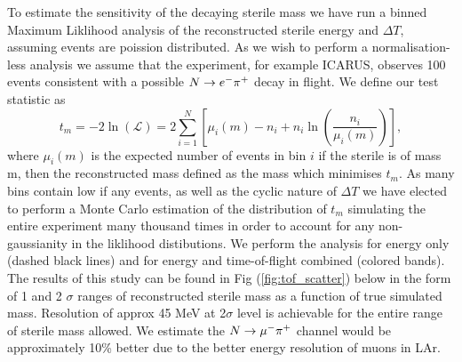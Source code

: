 \documentclass[11pt, a4paper]{article}
\def\ster{\ensuremath N}
\begin{document}
To estimate the sensitivity of the decaying sterile mass we have run a binned Maximum Liklihood analysis of the reconstructed sterile energy and $\Delta T$, assuming events are poission distributed. As we wish to perform a normalisation-less analysis we assume that the experiment, for example ICARUS, observes 100 events consistent with a possible $\ster\rightarrow e^- \pi^+$ decay in flight. We define our test statistic as \cite{Agashe:2014kda}
\[
	t_m = -2 \ln \left(\mathcal{L}\right) =  2 \sum_{i=1}^N \left[ \mu_i(m)-n_i +n_i \ln(\frac{n_i}{\mu_i(m)})  \right],
\]
where $\mu_i(m)$ is the expected number of events in bin $i$ if the sterile is of mass m, then the reconstructed mass defined as the mass which minimises $t_m$. As many bins contain low if any events, as well as the cyclic nature of $\Delta T$ we have elected to perform a Monte Carlo estimation of the distribution of $t_m$ simulating the entire experiment many thousand times in order to account for any non-gaussianity in the liklihood distibutions. We perform the analysis for energy only (dashed black lines) and for energy and time-of-flight combined (colored bands). The results of this study can be found in Fig (\ref{fig:tof_scatter}) below in the form of 1 and 2 $\sigma$ ranges of reconstructed sterile mass as a function of true simulated mass. Resolution of approx 45 MeV at 2$\sigma$ level is achievable for the entire range of sterile mass allowed. We estimate the $\ster\rightarrow \mu^- \pi^+$ channel would be approximately 10\% better due to the better energy resolution of muons in LAr.  
\end{document}
